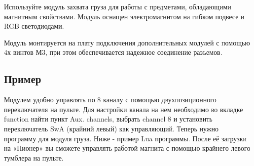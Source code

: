 \documentclass[a4paper,10pt,russian]{sphinxmanual}
\begin{document}
Используйте модуль захвата груза для работы с предметами, обладающими магнитным свойствами. Модуль оснащен электромагнитом на гибком подвесе и RGB светодиодами.

Модуль монтируется на плату подключения дополнительных модулей с помощью 4х винтов М3, при этом обеспечивается надежное соединение разъемов.


\subsection{Пример}
\label{\detokenize{module/cargo:id2}}
Модулем удобно управлять по 8 каналу с помощью двухпозиционного переключателя на пульте. Для настройки канала на нем необходимо во вкладке function найти пункт Aux. channels, выбрать channel 8 и установить переключатель SwA (крайний левый) как управляющий.
Теперь нужно  программу для модуля груза. Ниже - пример Lua программы. После её загрузки на «Пионер» вы сможете управлять работой магнита с помощью крайнего левого тумблера на пульте.
\end{document}
